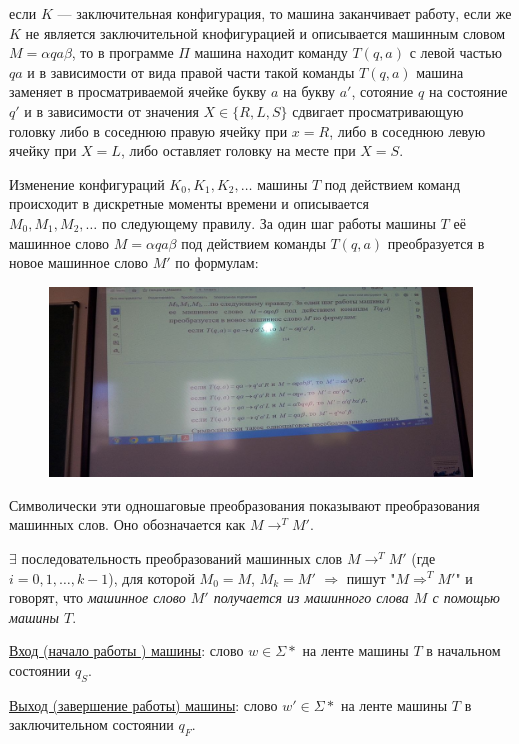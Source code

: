 \documentclass{article}
\begin{document}
если $K$ --- заключительная конфигурация, то машина заканчивает работу, если же  $K$ не является заключительной кнофигурацией и описывается машинным словом $M = \alpha q a \beta$, то в программе $\Pi$  машина находит команду $T(q, a)$ с левой частью $qa$ и в зависимости от вида правой части такой команды $T(q, a)$ машина заменяет в просматриваемой ячейке букву $a$ на букву $a'$, сотояние $q$ на состояние $q'$ и в зависимости от значения $X \in \{R, L, S\}$ сдвигает просматривающую головку либо в соседнюю правую ячейку при $x = R$, либо в соседнюю левую ячейку при $X = L$, либо оставляет головку на месте при $X = S$.

Изменение конфигураций $K_0, K_1, K_2, \dots$ машины $T$ под действием команд происходит в дискретные моменты времени и описывается \\ $M_0, M_1, M_2, \dots$ по следующему правилу. За один шаг работы машины $T$ её машинное слово $M = \alpha q a \beta$ под действием команды $T(q, a)$ преобразуется в новое машинное слово $M'$ по формулам:

\begin{figure}[h!]
    \includegraphics[width=\textwidth]{4.jpg}
\end{figure}

Символически эти одношаговые преобразования показывают преобразования машинных слов. Оно обозначается как $M \to^T M'$.

$\exists$ последовательность преобразований машинных слов $M \to^T M'$ (где $i = 0,1, \dots, k-1$), для которой $M_0 = M$, $M_k = M'$ $\Rightarrow$ пишут "$M \Rightarrow^T M'$"  и говорят, что \textit{машинное слово $M'$ получается из машинного слова $M$ с помощью машины $T$}.

\underline{Вход (начало работы ) машины}: слово $w \in \Sigma*$ на ленте машины $T$ в начальном состоянии $q_S$.

\underline{Выход (завершение работы) машины}: слово $w' \in \Sigma*$ на ленте машины $T$ в заключительном состоянии $q_F$.
\end{document}
